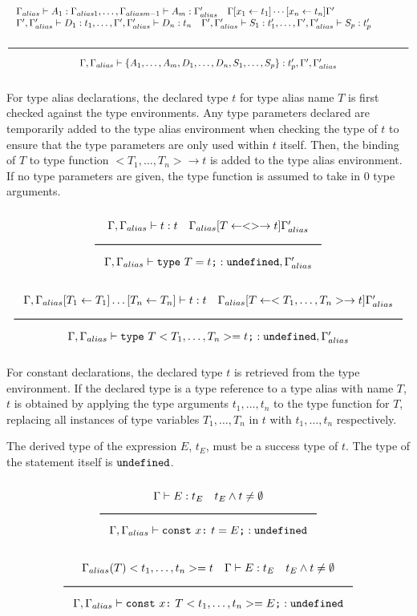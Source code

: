 \[
  \Rule{\begin{minipage}{140mm}
    $\Gamma_{alias} \vdash A_1 : \Gamma_{alias1}, \ldots, \Gamma_{aliasm-1} \vdash A_m : \Gamma'_{alias} \quad
    \Gamma [x_1 \leftarrow t_1] \cdots [x_n \leftarrow t_n] \Gamma'$ \\
    $\Gamma', \Gamma'_{alias} \vdash D_1 : t_1, \ldots, \Gamma', \Gamma'_{alias} \vdash D_n : t_n \quad
    \Gamma', \Gamma'_{alias} \vdash S_1 : t'_1, \ldots, \Gamma', \Gamma'_{alias} \vdash S_p : t'_p$\\
    \end{minipage}}{
    \Gamma, \Gamma_{alias} \vdash \{ A_1, \ldots, A_m, D_1, \ldots, D_n, S_1, \ldots, S_p \} : t'_p, \Gamma', \Gamma'_{alias}}
\]

For type alias declarations, the declared type $t$ for type alias name $T$ is first checked against the type environments.
Any type parameters declared are temporarily added to the type alias environment when checking the type of $t$
to ensure that the type parameters are only used within $t$ itself.
Then, the binding of $T$ to type function $<T_1, \ldots, T_n> \rightarrow t$ is added to the type alias environment.
If no type parameters are given, the type function is assumed to take in 0 type arguments.

\noindent
\[
  \Rule{\Gamma, \Gamma_{alias} \vdash t : t \quad \Gamma_{alias} [T \leftarrow <> \rightarrow t] \Gamma'_{alias}
    }{\Gamma, \Gamma_{alias} \vdash \texttt{type}\ T = t \texttt{;} : \Undefined, \Gamma'_{alias}}
\]
\noindent
\[
  \Rule{\Gamma, \Gamma_{alias}[T_1 \leftarrow T_1]\ldots[T_n \leftarrow T_n] \vdash t : t \quad
    \Gamma_{alias} [T \leftarrow <T_1, \ldots, T_n> \rightarrow t] \Gamma'_{alias}
    }{\Gamma, \Gamma_{alias} \vdash \texttt{type}\ T<T_1, \ldots, T_n> = t \texttt{;} : \Undefined, \Gamma'_{alias}}
\]
\noindent

For constant declarations, the declared type $t$ is retrieved from the type environment.
If the declared type is a type reference to a type alias with name $T$,
$t$ is obtained by applying the type arguments $t_1, \ldots, t_n$ to the type function for $T$,
replacing all instances of type variables $T_1, \ldots, T_n$ in $t$ with $t_1, \ldots, t_n$ respectively.

The derived type of the expression $E$, $t_E$, must be a success type of $t$.
The type of the statement itself is $\texttt{undefined}$.

\noindent
\[
  \Rule{\Gamma \vdash E : t_E \quad t_E \wedge t \neq \emptyset}{
    \Gamma, \Gamma_{alias} \vdash \texttt{const}\ x \texttt{:}\ t = E\texttt{;} : \Undefined}
\]
\noindent
\[
  \Rule{\Gamma_{alias}(T)<t_1, \ldots, t_n> = t \quad \Gamma \vdash E : t_E \quad t_E \wedge t \neq \emptyset
    }{\Gamma, \Gamma_{alias} \vdash \texttt{const}\ x \texttt{:}\ T<t_1, \ldots, t_n> = E\texttt{;} : \Undefined}
\]
\noindent

